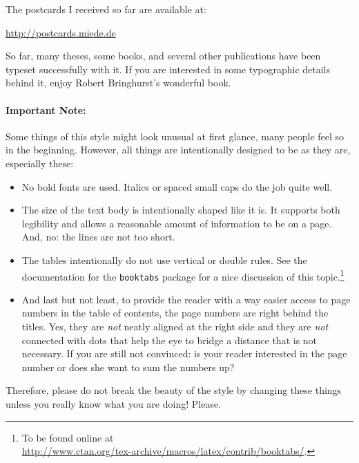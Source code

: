 \noindent The postcards I received so far are available at:
\begin{center}
 \url{http://postcards.miede.de}
\end{center}
 So far, many theses, some books, and several other publications have been typeset successfully with it. If you are interested in some typographic details behind it, enjoy Robert Bringhurst's wonderful book. %

\paragraph{Important Note:} Some things of this style might look unusual at first glance, many people feel so in the beginning. However, all things are intentionally designed to be as they are, especially these:
\begin{itemize}
\item No bold fonts are used. Italics or spaced small caps do the job quite well.
\item The size of the text body is intentionally shaped like it is. It supports both legibility and allows a reasonable amount of information to be on a page. And, no: the lines are not too short.
\item The tables intentionally do not use vertical or double rules. See the documentation for the \texttt{booktabs} package for a nice discussion of this topic.\footnote{To be found online at \\ \url{http://www.ctan.org/tex-archive/macros/latex/contrib/booktabs/}.}
\item And last but not least, to provide the reader with a way easier access to page numbers in the table of contents, the page numbers are right behind the titles. Yes, they are \emph{not} neatly aligned at the right side and they are \emph{not} connected with dots that help the eye to bridge a distance that is not necessary. If you are still not convinced: is your reader interested in the page number or does she want to sum the numbers up?
\end{itemize}

\noindent Therefore, please do not break the beauty of the style by changing these things unless you really know what you are doing! Please.


